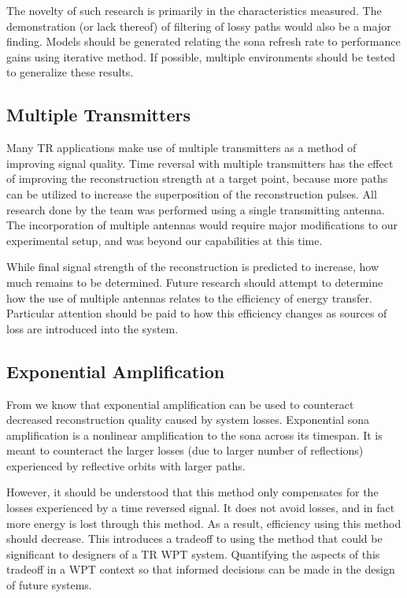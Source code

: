 The novelty of such research is primarily in the characteristics measured. The demonstration (or lack thereof) of filtering of lossy paths would also be a major finding. Models should be generated relating the sona refresh rate to performance gains using iterative method. If possible, multiple environments should be tested to generalize these results.

\subsection{Multiple Transmitters}

Many TR applications make use of multiple transmitters as a method of improving signal quality. Time reversal with multiple transmitters has the effect of improving the reconstruction strength at a target point, because more paths can be utilized to increase the superposition of the reconstruction pulses. All research done by the team was performed using a single transmitting antenna. The incorporation of multiple antennas would require major modifications to our experimental setup, and was beyond our capabilities at this time.

While final signal strength of the reconstruction is predicted to increase, how much remains to be determined. Future research should attempt to determine how the use of multiple antennas relates to the efficiency of energy transfer. Particular attention should be paid to how this efficiency changes as sources of loss are introduced into the system.

\subsection{Exponential Amplification}

From \cite{Biniyam} we know that exponential amplification can be used to counteract decreased reconstruction quality caused by system losses. Exponential sona amplification is a nonlinear amplification to the sona across its timespan. It is meant to counteract the larger losses (due to larger number of reflections) experienced by reflective orbits with larger paths.

However, it should be understood that this method only compensates for the losses experienced by a time reversed signal. It does not avoid losses, and in fact more energy is lost through this method. As a result, efficiency using this method should decrease. This introduces a tradeoff to using the method that could be significant to designers of a TR WPT system. Quantifying the aspects of this tradeoff in a WPT context so that informed decisions can be made in the design of future systems.

